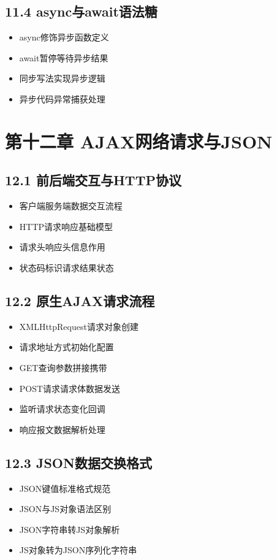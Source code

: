 \subsection{11.4 async与await语法糖}
\begin{itemize}
\item async修饰异步函数定义
\item await暂停等待异步结果
\item 同步写法实现异步逻辑
\item 异步代码异常捕获处理
\end{itemize}

\section{第十二章 AJAX网络请求与JSON}
\subsection{12.1 前后端交互与HTTP协议}
\begin{itemize}
\item 客户端服务端数据交互流程
\item HTTP请求响应基础模型
\item 请求头响应头信息作用
\item 状态码标识请求结果状态
\end{itemize}

\subsection{12.2 原生AJAX请求流程}
\begin{itemize}
\item XMLHttpRequest请求对象创建
\item 请求地址方式初始化配置
\item GET查询参数拼接携带
\item POST请求请求体数据发送
\item 监听请求状态变化回调
\item 响应报文数据解析处理
\end{itemize}

\subsection{12.3 JSON数据交换格式}
\begin{itemize}
\item JSON键值标准格式规范
\item JSON与JS对象语法区别
\item JSON字符串转JS对象解析
\item JS对象转为JSON序列化字符串
\end{itemize}

